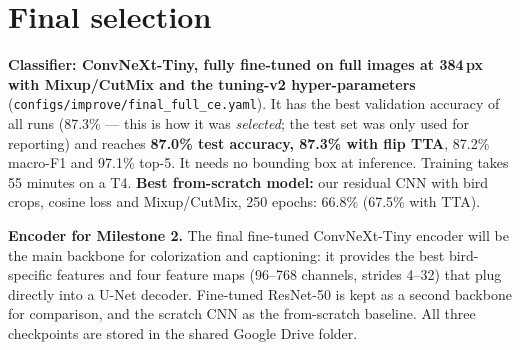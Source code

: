 \documentclass[11pt,a4paper]{article}
\begin{document}


\section{Final selection}
\textbf{Classifier: ConvNeXt-Tiny, fully fine-tuned on full images at 384\,px with Mixup/CutMix and the tuning-v2 hyper-parameters}
(\texttt{configs/improve/final\_full\_ce.yaml}). It has the best validation accuracy of all runs (87.3\% --- this is how it was
\emph{selected}; the test set was only used for reporting) and reaches \textbf{87.0\% test accuracy, 87.3\% with flip TTA}, 87.2\%
macro-F1 and 97.1\% top-5. It needs no bounding box at inference. Training takes 55 minutes on a T4. \textbf{Best from-scratch model:}
our residual CNN with bird crops, cosine loss and Mixup/CutMix, 250 epochs: 66.8\% (67.5\% with TTA).

\textbf{Encoder for Milestone 2.} The final fine-tuned ConvNeXt-Tiny encoder will be the main backbone for colorization and captioning:
it provides the best bird-specific features and four feature maps (96--768 channels, strides 4--32) that plug directly into a
U-Net decoder. Fine-tuned ResNet-50 is kept as a second backbone for comparison, and the scratch CNN as the from-scratch baseline.
All three checkpoints are stored in the shared Google Drive folder.

\end{document}
